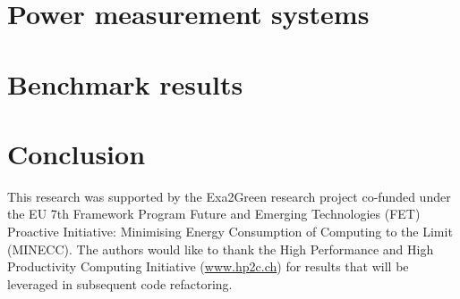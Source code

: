 \documentclass[twocolumn]{svjour3}
\DeclareRobustCommand\IPCClongname{}
\begin{document}
\section{Power measurement systems}
\label{sec:3}


\section{Benchmark results}
\label{sec:4}

\section{Conclusion}
\label{concl}




\begin{acknowledgements}
This  research  was  supported   by  the  Exa2Green  research  project
co-funded  under the  EU  7th Framework  Program  Future and  Emerging
Technologies (FET) Proactive Initiative: Minimising Energy Consumption
of Computing to  the Limit (MINECC).  The authors  would like to thank
the  High  Performance  and  High  Productivity  Computing  Initiative
(\url{www.hp2c.ch}) for  results that will be  leveraged in subsequent
code refactoring.
\end{acknowledgements}

\DeclareRobustCommand\IPCClongname{ - Intergovernmental Panel on Climate Change}



\end{document}
